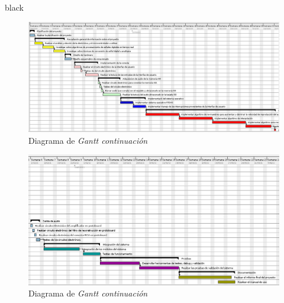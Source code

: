 \documentclass[11pt]{charter}
\begin{document}
\begin{consigna}{black}
\begin{figure}[htpb]
\centering 
\includegraphics[width=1.1\textwidth]{./Figuras/gant3.png}
\caption{Diagrama de \textit{Gantt continuación}}
\label{fig:gant1}
\end{figure}

\begin{figure}[htpb]
\centering 
\includegraphics[width=1.1\textwidth]{./Figuras/gant4.png}
\caption{Diagrama de \textit{Gantt continuación}}
\label{fig:gant1}
\end{figure}

\end{consigna}
\end{document}
